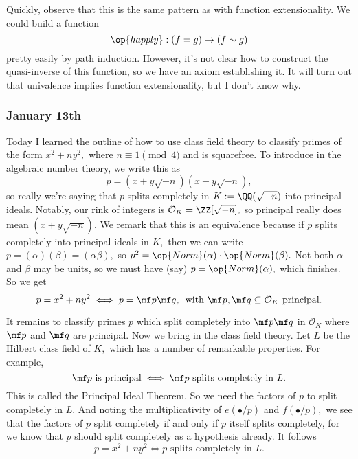 Quickly, observe that this is the same pattern as with function extensionality. We could build a function
\[\op{happly}:(f=g)\to(f\sim g)\]
pretty easily by path induction. However, it's not clear how to construct the quasi-inverse of this function, so we have an axiom establishing it. It will turn out that univalence implies function extensionality, but I don't know why.

\subsubsection{January 13th}
Today I learned the outline of how to use class field theory to classify primes of the form $x^2+ny^2,$ where $n\equiv1\pmod4$ and is squarefree. To introduce in the algebraic number theory, we write this as
\[p=\left(x+y\sqrt{-n}\right)\left(x-y\sqrt{-n}\right),\]
so really we're saying that $p$ splits completely in $K:=\QQ(\sqrt{-n})$ into principal ideals. Notably, our rink of integers is $\mathcal O_K=\ZZ[\sqrt{-n}],$ so principal really does mean $\left(x+y\sqrt{-n}\right).$ We remark that this is an equivalence because if $p$ splits completely into principal ideals in $K,$ then we can write $p=(\alpha)(\beta)=(\alpha\beta),$ so $p^2=\op{Norm}(\alpha)\cdot\op{Norm}(\beta).$ Not both $\alpha$ and $\beta$ may be units, so we must have (say) $p=\op{Norm}(\alpha),$ which finishes. So we get
\[p=x^2+ny^2\iff p=\mf p\mf q,\,\text{ with }\mf p,\mf q\subseteq\mathcal O_K\text{ principal}.\]

It remains to classify primes $p$ which split completely into $\mf p\mf q$ in $\mathcal O_K$ where $\mf p$ and $\mf q$ are principal. Now we bring in the class field theory. Let $L$ be the Hilbert class field of $K,$ which has a number of remarkable properties. For example,
\[\mf p\text{ is principal}\iff\mf p\text{ splits completely in }L.\]
This is called the Principal Ideal Theorem. So we need the factors of $p$ to split completely in $L.$ And noting the multiplicativity of $e(\bullet/p)$ and $f(\bullet/p),$ we see that the factors of $p$ split completely if and only if $p$ itself splits completely, for we know that $p$ should split completely as a hypothesis already. It follows
\[p=x^2+ny^2\iff p\text{ splits completely in }L.\]

